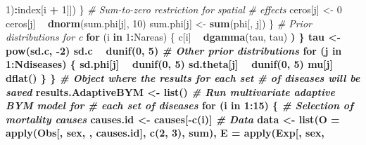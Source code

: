 \documentclass[]{article}
\newenvironment{Shaded}{\begin{snugshade}}{\end{snugshade}}
\newcommand{\KeywordTok}[1]{\textcolor[rgb]{0.13,0.29,0.53}{\textbf{#1}}}
\newcommand{\DataTypeTok}[1]{\textcolor[rgb]{0.13,0.29,0.53}{#1}}
\newcommand{\DecValTok}[1]{\textcolor[rgb]{0.00,0.00,0.81}{#1}}
\newcommand{\FloatTok}[1]{\textcolor[rgb]{0.00,0.00,0.81}{#1}}
\newcommand{\StringTok}[1]{\textcolor[rgb]{0.31,0.60,0.02}{#1}}
\newcommand{\CommentTok}[1]{\textcolor[rgb]{0.56,0.35,0.01}{\textit{#1}}}
\newcommand{\ControlFlowTok}[1]{\textcolor[rgb]{0.13,0.29,0.53}{\textbf{#1}}}
\newcommand{\OperatorTok}[1]{\textcolor[rgb]{0.81,0.36,0.00}{\textbf{#1}}}
\newcommand{\NormalTok}[1]{#1}
\begin{document}
\begin{Shaded}
\begin{Highlighting}[]
\StringTok{                }\DecValTok{1}\NormalTok{)}\OperatorTok{:}\NormalTok{index[i }\OperatorTok{+}\StringTok{ }\DecValTok{1}\NormalTok{]])}
\NormalTok{        \}}
        \CommentTok{# Sum-to-zero restriction for spatial}
        \CommentTok{# effects}
\NormalTok{        ceros[j] <-}\StringTok{ }\DecValTok{0}
\NormalTok{        ceros[j] }\OperatorTok{~}\StringTok{ }\KeywordTok{dnorm}\NormalTok{(sum.phi[j], }\DecValTok{10}\NormalTok{)}
\NormalTok{        sum.phi[j] <-}\StringTok{ }\KeywordTok{sum}\NormalTok{(phi[, j])}
\NormalTok{    \}}
    \CommentTok{# Prior distributions for c}
    \ControlFlowTok{for}\NormalTok{ (i }\ControlFlowTok{in} \DecValTok{1}\OperatorTok{:}\NormalTok{Nareas) \{}
\NormalTok{        c[i] }\OperatorTok{~}\StringTok{ }\KeywordTok{dgamma}\NormalTok{(tau, tau) }\OperatorTok{%_%}\StringTok{ }\KeywordTok{I}\NormalTok{(}\FloatTok{0.001}\NormalTok{, }
\NormalTok{            )}
\NormalTok{    \}}
\NormalTok{    tau <-}\StringTok{ }\KeywordTok{pow}\NormalTok{(sd.c, }\OperatorTok{-}\DecValTok{2}\NormalTok{)}
\NormalTok{    sd.c }\OperatorTok{~}\StringTok{ }\KeywordTok{dunif}\NormalTok{(}\DecValTok{0}\NormalTok{, }\DecValTok{5}\NormalTok{)}
    \CommentTok{# Other prior distributions}
    \ControlFlowTok{for}\NormalTok{ (j }\ControlFlowTok{in} \DecValTok{1}\OperatorTok{:}\NormalTok{Ndiseases) \{}
\NormalTok{        sd.phi[j] }\OperatorTok{~}\StringTok{ }\KeywordTok{dunif}\NormalTok{(}\DecValTok{0}\NormalTok{, }\DecValTok{5}\NormalTok{)}
\NormalTok{        sd.theta[j] }\OperatorTok{~}\StringTok{ }\KeywordTok{dunif}\NormalTok{(}\DecValTok{0}\NormalTok{, }\DecValTok{5}\NormalTok{)}
\NormalTok{        mu[j] }\OperatorTok{~}\StringTok{ }\KeywordTok{dflat}\NormalTok{()}
\NormalTok{    \}}
\NormalTok{\}}
\CommentTok{# Object where the results for each set}
\CommentTok{# of diseases will be saved}
\NormalTok{results.AdaptiveBYM <-}\StringTok{ }\KeywordTok{list}\NormalTok{()}
\CommentTok{# Run multivariate adaptive BYM model for}
\CommentTok{# each set of diseases}
\ControlFlowTok{for}\NormalTok{ (i }\ControlFlowTok{in} \DecValTok{1}\OperatorTok{:}\DecValTok{15}\NormalTok{) \{}
    \CommentTok{# Selection of mortality causes}
\NormalTok{    causes.id <-}\StringTok{ }\NormalTok{causes[}\OperatorTok{-}\KeywordTok{c}\NormalTok{(i)]}
    \CommentTok{# Data}
\NormalTok{    data <-}\StringTok{ }\KeywordTok{list}\NormalTok{(}\DataTypeTok{O =} \KeywordTok{apply}\NormalTok{(Obs[, sex, , causes.id], }
        \KeywordTok{c}\NormalTok{(}\DecValTok{2}\NormalTok{, }\DecValTok{3}\NormalTok{), sum), }\DataTypeTok{E =} \KeywordTok{apply}\NormalTok{(Exp[, sex, }
}
\end{Highlighting}
\end{Shaded}
\end{document}
